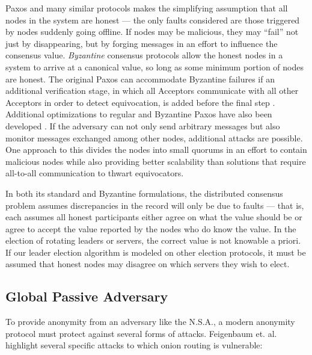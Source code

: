     Paxos and many similar protocols makes the simplifying assumption that all
    nodes in the system are honest --- the only faults considered are those
    triggered by nodes suddenly going offline. If nodes may be malicious, they
    may ``fail'' not just by disappearing, but by forging messages in an effort
    to influence the consensus value. \emph{Byzantine} consensus protocols allow
    the honest nodes in a system to arrive at a canonical value, so long as some
    minimum portion of nodes are honest. The original Paxos can
    accommodate Byzantine failures if an additional verification stage, in which
    all Acceptors communicate with all other Acceptors in order to detect
    equivocation, is added before the final step \cite{castro_practical_1999}.
    Additional optimizations to regular and Byzantine Paxos have also been
    developed \cite{lamport_fast_2006}. If the adversary can not only send
    arbitrary messages but also monitor messages exchanged among other nodes,
    additional attacks are possible. One approach to this divides the nodes into
    small quorums in an effort to contain malicious nodes \cite{king_load_2011}
    while also providing better scalability than solutions that require
    all-to-all communication to thwart equivocators.

    In both its standard and Byzantine formulations, the distributed consensus
    problem assumes discrepancies in the record will only be due to faults ---
    that is, each assumes all honest participants either agree on what the value
    should be or agree to accept the value reported by the nodes who do know the
    value.  In the election of rotating leaders or servers, the correct value is
    not knowable a priori. If our leader election algorithm is modeled on other
    election protocols, it must be assumed that honest nodes may disagree on
    which servers they wish to elect.

  \subsection{Global Passive Adversary}
  To provide anonymity from an adversary like the N.S.A., a modern anonymity
  protocol must protect against several forms of attacks. Feigenbaum et.
  al.\cite{feigenbaum_seeking_2013} highlight several specific attacks to which
  onion routing is vulnerable:
